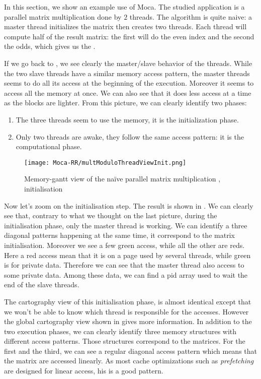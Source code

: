 In this section, we show an example use of \gls{Moca}.
The studied application is a parallel matrix multiplication done by $2$ threads.
The algorithm is quite naive: a master thread initializes the matrix then creates two threads.
Each thread will compute half of the result matrix: the first will do the even index and the second the odds, which gives us the .


If we go back to , we see clearly the master/slave behavior of the threads.
While the two slave threads have a similar memory access pattern, the master threads seems to do all its access at the beginning of the execution.
Moreover it seems to access all the memory at once.
We can also see that it does less access at a time as the blocks are lighter.
From this picture, we can clearly identify two phases:
\begin{enumerate}
    \item The three threads seem to use the memory, it is the initialization phase.
    \item Only two threads are awake, they follow the same access pattern: it
        is the computational phase.
\end{enumerate}

\begin{figure}[htb]
    \centering
    \texttt{[image: Moca-RR/multModuloThreadViewInit.png]}
    \caption{Memory-gantt view of the naïve parallel matrix multiplication ,
    initialisation}
    \label{fig:ocelotl-th1}
\end{figure}

Now let's zoom on the initialisation step.
The result is shown in .
We can clearly see that, contrary to what we thought on the last picture, during the initialisation phase, only the master thread is working.
We can identify a three diagonal patterns happening at the same time, it correspond to the matrix initialisation.
Moreover we see a few green access, while all the other are reds.
Here a red access mean that it is on a page used by several threads, while green is for private data.
Therefore we can see that the master thread also access to some private data.
Among these data, we can find a pid array used to wait the end of the slave threads.

The cartography view of this initialisation phase, is almost identical except that we won't be able to know which thread is responsible for the accesses.
However the global cartography view shown in  gives more information.
In addition to the two execution phases, we can clearly identify three memory structures with different access patterns.
Those structures correspond to the matrices.
For the first and the third, we can see a regular diagonal access pattern which means that the matrix are accessed linearly.
As most cache optimizations such as \emph{prefetching} are designed for linear access, his is a good pattern.

